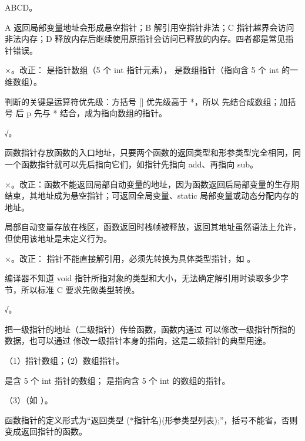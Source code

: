 \documentclass[a4paper,11pt]{article}
\begin{document}
\q ABCD。\begin{analysis}A 返回局部变量地址会形成悬空指针；B 解引用空指针非法；C 指针越界会访问非法内存；D 释放内存后继续使用原指针会访问已释放的内存。四者都是常见指针错误。\end{analysis}


\q ×。改正： 是指针数组（5 个 int 指针元素）， 是数组指针（指向含 5 个 int 的一维数组）。\begin{analysis}判断的关键是运算符优先级：方括号 [] 优先级高于 *，所以  先结合成数组；加括号  后 p 先与 * 结合，成为指向数组的指针。\end{analysis}

\q √。\begin{analysis}函数指针存放函数的入口地址，只要两个函数的返回类型和形参类型完全相同，同一个函数指针就可以先后指向它们，如指针先指向 add、再指向 sub。\end{analysis}

\q ×。改正：函数不能返回局部自动变量的地址，因为函数返回后局部变量的生存期结束，其地址成为悬空指针；可返回全局变量、static 局部变量或动态分配内存的地址。\begin{analysis}局部自动变量存放在栈区，函数返回时栈帧被释放，返回其地址虽然语法上允许，但使用该地址是未定义行为。\end{analysis}

\q ×。改正： 指针不能直接解引用，必须先转换为具体类型指针，如 。\begin{analysis}编译器不知道 void 指针所指对象的类型和大小，无法确定解引用时读取多少字节，所以标准 C 要求先做类型转换。\end{analysis}

\q √。\begin{analysis}把一级指针的地址（二级指针）传给函数，函数内通过  可以修改一级指针所指的数据，也可以通过  修改一级指针本身的指向，这是二级指针的典型用途。\end{analysis}


\q （1）指针数组；（2）数组指针。\begin{analysis} 是含 5 个 int 指针的数组； 是指向含 5 个 int 的数组的指针。\end{analysis}

\q （3）（如 ）。\begin{analysis}函数指针的定义形式为“返回类型 (*指针名)(形参类型列表);”，括号不能省，否则变成返回指针的函数。\end{analysis}
\end{document}
